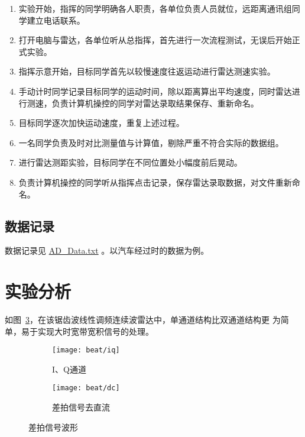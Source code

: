 \documentclass[../main]{subfiles}
\begin{document}
\begin{enumerate}
  \item 实验开始，指挥的同学明确各人职责，各单位负责人员就位，远距离通讯组同
    学建立电话联系。
  \item 打开电脑与雷达，各单位听从总指挥，首先进行一次流程测试，无误后开始正
    式实验。
  \item 指挥示意开始，目标同学首先以较慢速度往返运动进行雷达测速实验。
  \item 手动计时同学记录目标同学的运动时间，除以距离算出平均速度，同时雷达进
    行测速，负责计算机操控的同学对雷达录取结果保存、重新命名。
  \item 目标同学逐次加快运动速度，重复上述过程。
  \item 一名同学负责及时对比测量值与计算值，剔除严重不符合实际的数据组。
  \item 进行雷达测距实验，目标同学在不同位置处小幅度前后晃动。
  \item 负责计算机操控的同学听从指挥点击记录，保存雷达录取数据，对文件重新命
    名。
\end{enumerate}

\subsection{数据记录}%
\label{sub:\arabic{chapter}record}

数据记录见
\href{https://github.com/Freed-Wu/radar-principles-report/blob/master/lst/AD_Data.txt}{AD\_Data.txt}
。以汽车经过时的数据为例。

\section{实验分析}%
\label{sec:\arabic{chapter}analysis}

如图~\ref{fig:beat}，在该锯齿波线性调频连续波雷达中，单通道结构比双通道结构更
为简单，易于实现大时宽带宽积信号的处理。

\begin{figure}[htbp]
  \centering
  \begin{subfigure}[htbp]{0.45\linewidth}
    \centering
    \texttt{[image: beat/iq]}
    \caption{I、Q通道}%
    \label{fig:beat/iq}
  \end{subfigure}
  \quad
  \begin{subfigure}[htbp]{0.45\linewidth}
    \centering
    \texttt{[image: beat/dc]}
    \caption{差拍信号去直流}%
    \label{fig:beat/dc}
  \end{subfigure}
  \caption{差拍信号波形}%
  \label{fig:beat}
\end{figure}
\end{document}
